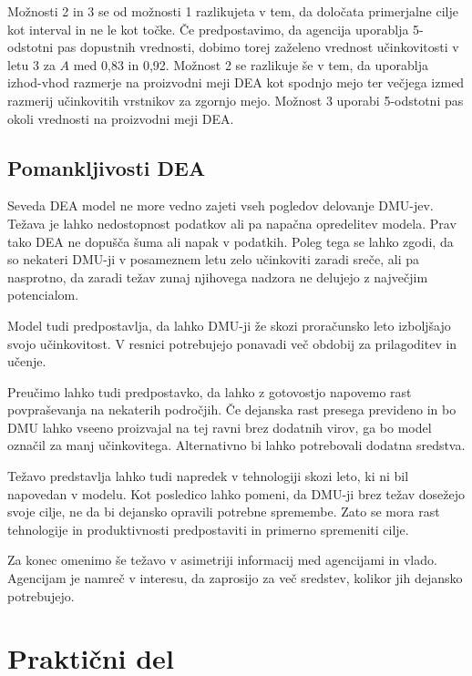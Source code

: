 \documentclass[12pt,a4paper]{article}
\theoremstyle{definition}
\begin{document}
Možnosti 2 in 3 se od možnosti 1 razlikujeta v tem, da
določata primerjalne cilje kot interval in ne le kot točke.
Če predpostavimo, da agencija uporablja 5-odstotni pas 
dopustnih vrednosti, dobimo torej zaželeno vrednost 
učinkovitosti v letu 3 za $A$ med 0{,}83 in 0{,}92.
Možnost 2 se razlikuje še v tem, da uporablja
izhod-vhod razmerje na proizvodni meji DEA kot
spodnjo mejo ter večjega izmed razmerij učinkovitih
vrstnikov za zgornjo mejo. Možnost 3 uporabi 5-odstotni
pas okoli vrednosti na proizvodni meji DEA. 
\cite{Yaisawarng2002}

\subsection{Pomankljivosti DEA}

Seveda DEA model ne more vedno zajeti vseh pogledov
delovanje DMU-jev. Težava je lahko nedostopnost
podatkov ali pa napačna opredelitev modela.
Prav tako DEA ne dopušča šuma ali napak v podatkih.
Poleg tega se lahko zgodi, da so nekateri DMU-ji v
posameznem letu zelo učinkoviti zaradi sreče, ali pa
nasprotno, da zaradi težav zunaj njihovega nadzora
ne delujejo z največjim potencialom.

Model tudi predpostavlja, da lahko DMU-ji že skozi
proračunsko leto izboljšajo svojo učinkovitost. V
resnici potrebujejo ponavadi več obdobij za prilagoditev
in učenje. 

Preučimo lahko tudi predpostavko, da lahko z gotovostjo
napovemo rast povpraševanja na nekaterih področjih. Če
dejanska rast presega prevideno in bo DMU lahko vseeno
proizvajal na tej ravni brez dodatnih virov, ga bo
model označil za manj učinkovitega. Alternativno bi
lahko potrebovali dodatna sredstva.

Težavo predstavlja lahko tudi napredek v tehnologiji
skozi leto, ki ni bil napovedan v modelu. Kot posledico
lahko pomeni, da DMU-ji brez težav dosežejo svoje cilje,
ne da bi dejansko opravili potrebne spremembe. Zato se
mora rast tehnologije in produktivnosti predpostaviti 
in primerno spremeniti cilje.

Za konec omenimo še težavo v asimetriji informacij med
agencijami in vlado. Agencijam je namreč v interesu,
da zaprosijo za več sredstev, kolikor jih dejansko 
potrebujejo. 

\section{Praktični del}



\nocite*{}


\end{document}
